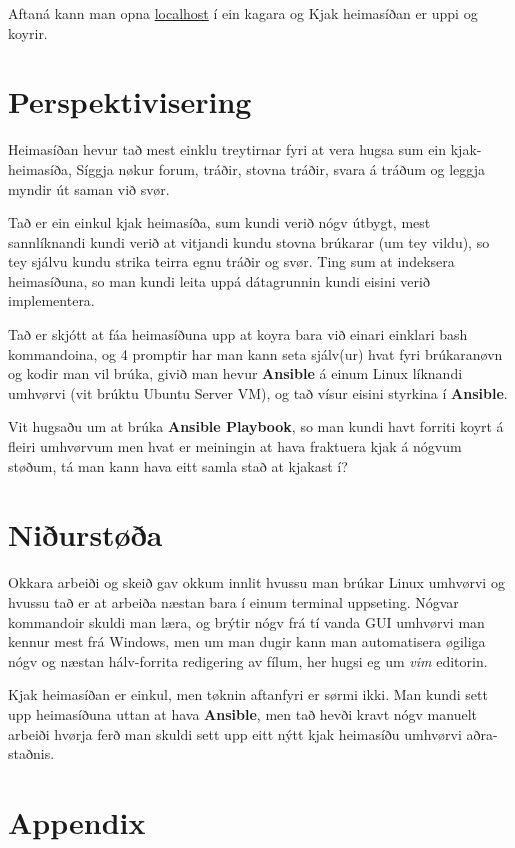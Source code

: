 \documentclass{article}
\begin{document}
 Aftaná kann man opna \underline{localhost} í ein kagara og Kjak heimasíðan er uppi
 og koyrir.


\section{Perspektivisering}
\par Heimasíðan hevur tað mest einklu treytirnar fyri at vera hugsa sum ein kjak-heimasíða,
Síggja nøkur forum, tráðir, stovna tráðir, svara á tráðum og leggja myndir út saman við svør.
\par Tað er ein einkul kjak heimasíða, sum kundi verið nógv útbygt, mest sannlíknandi
kundi verið at vitjandi kundu stovna brúkarar (um tey vildu), so tey sjálvu kundu strika
teirra egnu tráðir og svør. Ting sum at indeksera heimasíðuna, so man kundi leita uppá
dátagrunnin kundi eisini verið implementera.
\par Tað er skjótt at fáa heimasíðuna upp at koyra bara við einari einklari bash kommandoina,
og 4 promptir har man kann seta sjálv(ur) hvat fyri brúkaranøvn og kodir man vil brúka,
givið man hevur \textbf{Ansible} á einum
Linux líknandi umhvørvi (vit brúktu Ubuntu Server VM), og tað vísur eisini styrkina í \textbf{Ansible}.
\par Vit hugsaðu um at brúka \textbf{Ansible Playbook}, so man kundi havt forriti koyrt á 
fleiri umhvørvum men hvat er meiningin at hava fraktuera kjak á nógvum støðum, tá man kann hava
eitt samla stað at kjakast í?

\section{Niðurstøða}
\par Okkara arbeiði og skeið gav okkum innlit hvussu man brúkar Linux umhvørvi og hvussu tað
er at arbeiða næstan bara í einum terminal uppseting. Nógvar kommandoir skuldi man læra, og
brýtir nógv frá tí vanda GUI umhvørvi man kennur mest frá Windows, men um man dugir kann man
automatisera øgiliga nógv og næstan hálv-forrita redigering av fílum, her hugsi eg um \textit{vim}
editorin.
\par Kjak heimasíðan er einkul, men tøknin aftanfyri er sørmi ikki. Man kundi sett upp heimasíðuna
uttan at hava \textbf{Ansible}, men tað hevði kravt nógv manuelt arbeiði hvørja ferð man skuldi
sett upp eitt nýtt kjak heimasíðu umhvørvi aðra-staðnis.

\section{Appendix}
\end{document}
